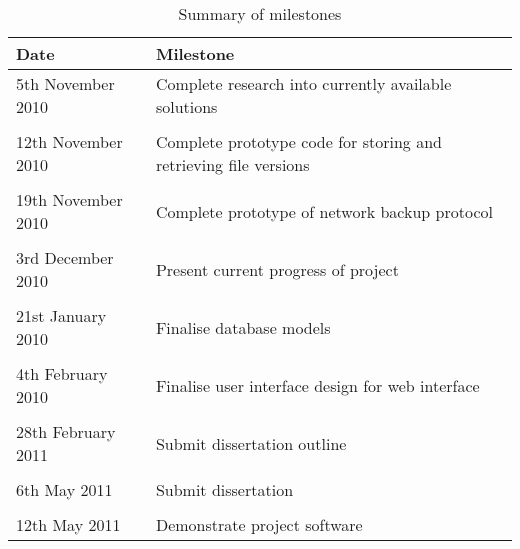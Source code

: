 \documentclass[a4paper]{article}
\begin{document}
    \begin{table}[H]
        \centering
        \begin{tabular}{ l | l }
            Date & Milestone \\ \hline

            5th November 2010   & Complete research into currently available
                                    solutions \\ \\
            12th November 2010  & Complete prototype code for storing and
                                    retrieving file versions \\ \\
            19th November 2010  & Complete prototype of network backup
                                    protocol \\ \\
            3rd December 2010   & Present current progress of project \\ \\
            21st January 2010   & Finalise database models \\ \\
            4th February 2010   & Finalise user interface design for web
                                    interface \\ \\
            28th February 2011  & Submit dissertation outline \\ \\
            6th May 2011        & Submit dissertation \\ \\
            12th May 2011       & Demonstrate project software \\
        \end{tabular}
        \caption{Summary of milestones}
    \end{table}
\end{document}
